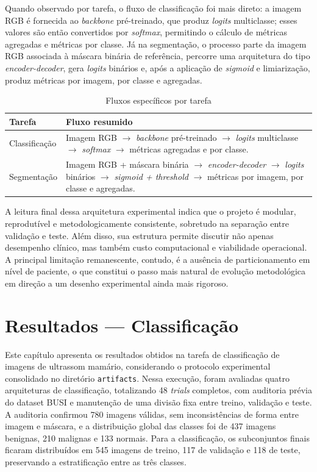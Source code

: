 \documentclass[tcc,capa]{texufpel}
\begin{document}
Quando observado por tarefa, o fluxo de classificação foi mais direto: a imagem RGB é fornecida ao \textit{backbone} pré-treinado, que produz \textit{logits} multiclasse; esses valores são então convertidos por \textit{softmax}, permitindo o cálculo de métricas agregadas e métricas por classe. Já na segmentação, o processo parte da imagem RGB associada à máscara binária de referência, percorre uma arquitetura do tipo \textit{encoder-decoder}, gera \textit{logits} binários e, após a aplicação de \textit{sigmoid} e limiarização, produz métricas por imagem, por classe e agregadas.

\begin{table}[htbp]
	\centering
	\caption{Fluxos específicos por tarefa}
	\label{tab:fluxos_tarefas_experimento}
	\begin{tabular}{|p{3.2cm}|p{10.2cm}|}
		\hline
		\textbf{Tarefa} & \textbf{Fluxo resumido} \\ \hline
		Classificação & Imagem RGB \(\rightarrow\) \textit{backbone} pré-treinado \(\rightarrow\) \textit{logits} multiclasse \(\rightarrow\) \textit{softmax} \(\rightarrow\) métricas agregadas e por classe. \\ \hline
		Segmentação & Imagem RGB + máscara binária \(\rightarrow\) \textit{encoder-decoder} \(\rightarrow\) \textit{logits} binários \(\rightarrow\) \textit{sigmoid + threshold} \(\rightarrow\) métricas por imagem, por classe e agregadas. \\ \hline
	\end{tabular}
\end{table}

A leitura final dessa arquitetura experimental indica que o projeto é modular, reprodutível e metodologicamente consistente, sobretudo na separação entre validação e teste. Além disso, sua estrutura permite discutir não apenas desempenho clínico, mas também custo computacional e viabilidade operacional. A principal limitação remanescente, contudo, é a ausência de particionamento em nível de paciente, o que constitui o passo mais natural de evolução metodológica em direção a um desenho experimental ainda mais rigoroso.

\chapter{Resultados --- Classificação}

Este capítulo apresenta os resultados obtidos na tarefa de classificação de imagens de ultrassom mamário, considerando o protocolo experimental consolidado no diretório \texttt{artifacts}. Nessa execução, foram avaliadas quatro arquiteturas de classificação, totalizando 48 \textit{trials} completos, com auditoria prévia do dataset BUSI e manutenção de uma divisão fixa entre treino, validação e teste. A auditoria confirmou 780 imagens válidas, sem inconsistências de forma entre imagem e máscara, e a distribuição global das classes foi de 437 imagens benignas, 210 malignas e 133 normais. Para a classificação, os subconjuntos finais ficaram distribuídos em 545 imagens de treino, 117 de validação e 118 de teste, preservando a estratificação entre as três classes.
\end{document}
